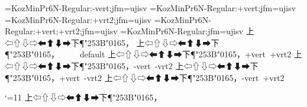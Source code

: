 
\def\FN{KozMinPr6N-Regular}

\leavevmode
\tfont\VN=\FN:-vert;jfm=ujisv
\tfont\VT=\FN:+vert;jfm=ujisv
\tfont\VU=\FN:+vrt2;jfm=ujisv
\tfont\VB=\FN:+vert;+vrt2;jfm=ujisv
\tfont\VD=\FN:jfm=ujisv
\tentt
{}
\def\TEST{\tate 上⇦⇧⇩⇨⬅⬆⬇➡下¶\ltjjachar"253B\ltjjachar"0165，}
\hbox{\TEST}
\hbox{\VD\TEST ~~~~~default}
\hbox{\VB\TEST +vert +vrt2}
\hbox{\VN\TEST -vert -vrt2}
\hbox{\VT\TEST +vert -vrt2}
\hbox{\VU\TEST -vert +vrt2}

\par

\catcode`\@=11
\expandafter\@gobble\TEST

\bye

